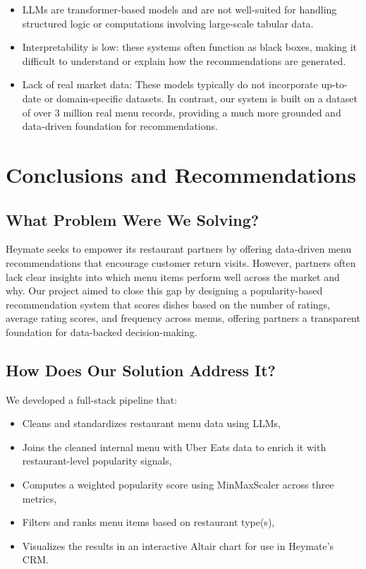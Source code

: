 \documentclass[
  11pt,
  a4paper,
  DIV=11,
  numbers=noendperiod]{scrartcl}
\providecommand{\tightlist}{%
  \setlength{\itemsep}{0pt}\setlength{\parskip}{0pt}}\usepackage{longtable,booktabs,array}
\begin{document}
\begin{itemize}
\tightlist
\item
  LLMs are transformer-based models and are not well-suited for handling
  structured logic or computations involving large-scale tabular data.
\item
  Interpretability is low: these systems often function as black boxes,
  making it difficult to understand or explain how the recommendations
  are generated.
\item
  Lack of real market data: These models typically do not incorporate
  up-to-date or domain-specific datasets. In contrast, our system is
  built on a dataset of over 3 million real menu records, providing a
  much more grounded and data-driven foundation for recommendations.
\end{itemize}

\section{Conclusions and
Recommendations}\label{conclusions-and-recommendations}

\subsection{What Problem Were We
Solving?}\label{what-problem-were-we-solving}

Heymate seeks to empower its restaurant partners by offering data-driven
menu recommendations that encourage customer return visits. However,
partners often lack clear insights into which menu items perform well
across the market and why. Our project aimed to close this gap by
designing a popularity-based recommendation system that scores dishes
based on the number of ratings, average rating scores, and frequency
across menus, offering partners a transparent foundation for data-backed
decision-making.

\subsection{How Does Our Solution Address
It?}\label{how-does-our-solution-address-it}

We developed a full-stack pipeline that:

\begin{itemize}
\tightlist
\item
  Cleans and standardizes restaurant menu data using LLMs,
\item
  Joins the cleaned internal menu with Uber Eats data to enrich it with
  restaurant-level popularity signals,
\item
  Computes a weighted popularity score using MinMaxScaler across three
  metrics,
\item
  Filters and ranks menu items based on restaurant type(s),
\item
  Visualizes the results in an interactive Altair chart for use in
  Heymate's CRM.
\end{itemize}
\end{document}
